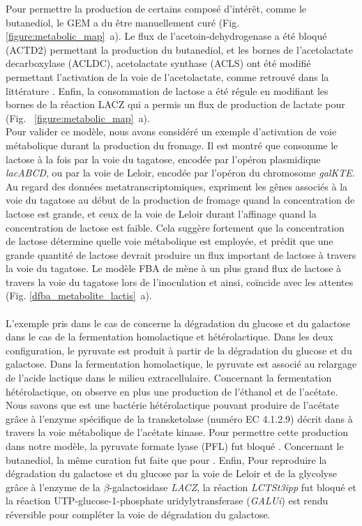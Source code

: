 \documentclass[../main.tex]{subfiles}
\begin{document}
Pour permettre la production de certains composé d'intérêt, comme le butanediol, le GEM a du être manuellement curé (Fig.~ \ref{figure:metabolic_map}~a). Le flux de l'acetoin-dehydrogenase a été bloqué (ACTD2) permettant la production du butanediol, et les bornes de l'acetolactate decarboxylase (ACLDC), acetolactate synthase (ACLS) ont été modifié permettant l'activation de la voie de l'acetolactate, comme retrouvé dans la littérature \citep*{Carroll1999,Swindell1996,Makhlouf2006}. Enfin, la consommation de lactose a été régule en modifiant les bornes de la réaction LACZ qui a permis un flux de production de lactate pour \lactis (Fig.~ \ref{figure:metabolic_map}~a).\\
Pour valider ce modèle, nous avons considéré un exemple d'activation de voie métabolique durant la production du fromage. Il est montré que \lactis consomme le lactose à la fois par la voie du tagatose, encodée par l'opéron plasmidique \textit{lacABCD}, ou par la voie de Leloir, encodée par l'opéron du chromosome \textit{galKTE}. Au regard des données metatranscriptomiques, \lactis expriment les gênes associés à la voie du tagatose au début de la production de fromage quand la concentration de lactose est grande, et ceux de la voie de Leloir durant l'affinage quand la concentration de lactose est faible. Cela suggère fortement que la concentration de lactose détermine quelle voie métabolique est employée, et prédit que une grande quantité de lactose devrait produire un flux important de lactose à travers la voie du tagatose. Le modèle FBA de \lactis mène à un plus grand flux de lactose à travers la voie du tagatose lors de l'inoculation et ainsi, coïncide avec les attentes (Fig. \ref{dfba_metabolite_lactis}~a).

\paragraph{\plantarum}
L'exemple pris dans le cas de \plantarum concerne la dégradation du glucose et du galactose dans le cas de la fermentation homolactique et hétérolactique. Dans les deux configuration, le pyruvate est produit à partir de la dégradation du glucose et du galactose. Dans la fermentation homolactique, le pyruvate est associé au relargage de l'acide lactique dans le milieu extracellulaire. Concernant la fermentation hétérolactique, on observe en plus une production de l'éthanol et de l'acétate. Nous savons que \plantarum est une bactérie hétérolactique pouvant produire de l'acétate grâce à l'enzyme spécifique de la transketolase (numéro EC 4.1.2.9) décrit dans \citep{Abedi2020} à travers la voie métabolique de l'acétate kinase. Pour permettre cette production dans notre modèle, la pyruvate formate lyase (PFL) fut bloqué \citep{Quatravaux2006}. Concernant le butanediol, la même curation fut faite que pour \lactis. Enfin, Pour reproduire la dégradation du galactose et du glucose par la voie de Leloir et de la glycolyse grâce à l'enzyme de la $\beta$-galactosidase \textit{LACZ}, la réaction \textit{LCTSt3ipp} fut bloqué et la réaction UTP-glucose-1-phosphate uridylytransferase (\textit{GALUi}) est rendu réversible pour compléter la voie de dégradation du galactose.
\end{document}
